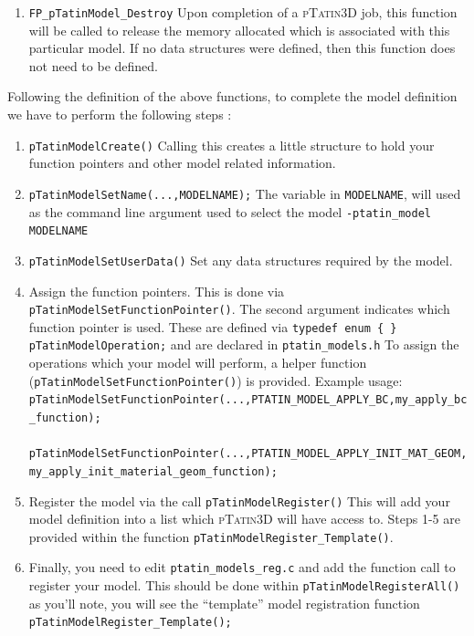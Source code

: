 \documentclass[paper=a4, fontsize=10pt,twoside]{scrartcl}
\newcommand{\ptat}{{{\textsc{pTatin3D}}}}
\newcommand{\shellcmd}[1]{\\\indent\indent\texttt{\hspace{5mm}\footnotesize #1}\\}
\newcommand{\unix}[1]{\texttt{\footnotesize #1}}
\begin{document}
{{\begin{enumerate}
	\item \unix{FP\_pTatinModel\_Destroy}
	Upon completion of a {\ptat} job, this function will be called to release the memory allocated which is associated
	with this particular model. If no data structures were defined, then this function does not need to be defined.
\end{enumerate}

Following the definition of the above functions, to complete the model definition we have to perform the following steps :
\begin{enumerate}
	\item \unix{pTatinModelCreate()}
Calling this creates a little structure to hold your function pointers and other model related information.

	\item \unix{pTatinModelSetName(...,MODELNAME);}
The variable in \unix{MODELNAME}, will used as the command line argument used to select the model
	\unix{-ptatin\_model MODELNAME}

	\item \unix{pTatinModelSetUserData()}
Set any data structures required by the model.

	\item Assign the function pointers. This is done via \unix{pTatinModelSetFunctionPointer()}.
The second argument indicates which function pointer is used. These are defined via
\unix{typedef enum \{ \} pTatinModelOperation;}
and are declared in
\unix{ptatin\_models.h}
To assign the operations which your model will perform, a helper function (\unix{pTatinModelSetFunctionPointer()}) is provided.
Example usage:
\shellcmd{pTatinModelSetFunctionPointer(...,PTATIN\_MODEL\_APPLY\_BC,my\_apply\_bc\_function);}
\shellcmd{pTatinModelSetFunctionPointer(...,PTATIN\_MODEL\_APPLY\_INIT\_MAT\_GEOM,my\_apply\_init\_material\_geom\_function);} %

	\item Register the model via the call
\unix{pTatinModelRegister()}
This will add your model definition into a list which {\ptat} will have access to.
Steps 1-5 are provided within the function \unix{pTatinModelRegister\_Template()}.

	\item Finally, you need to edit
	\unix{ptatin\_models\_reg.c}
and add the function call to register your model.
This should be done within
		\unix{pTatinModelRegisterAll()}
as you'll note, you will see the ``template'' model registration function
		\unix{pTatinModelRegister\_Template();}


\end{enumerate}}}
\end{document}
